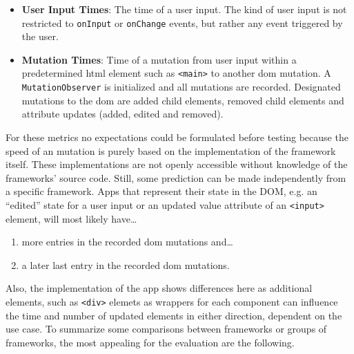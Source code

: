 \documentclass[a4paper, 12pt]{article}
\begin{document}
\begin{itemize}
  \item \textbf{User Input Times}: The time of a user input.
  The kind of user input is not restricted to \verb|onInput| or \verb|onChange| events, but rather any event triggered by the user.
  \item \textbf{Mutation Times}: Time of a mutation from user input within a predetermined \acrshort{html} element such as \verb|<main>| to another \acrshort{dom} mutation.
  A \verb|MutationObserver| is initialized and all mutations are recorded. Designated mutations to the \acrshort{dom} are added child elements, removed child elements and attribute updates (added, edited and removed).
\end{itemize}

For these metrics no expectations could be formulated before testing because the speed of an mutation is purely based on the implementation of the framework itself.
These implementations are not openly accessible without knowledge of the frameworks' source code.
Still, some prediction can be made independently from a specific framework.
Apps that represent their state in the DOM, e.g. an \enquote{edited} state for a user input or an updated value attribute of an \verb|<input>| element, will most likely have\dots

\begin{enumerate}
  \item more entries in the recorded \acrshort{dom} mutations and\dots
  \item a later last entry in the recorded \acrshort{dom} mutations.
\end{enumerate}

Also, the implementation of the app shows differences here as additional elements, such as \verb|<div>| elemets as wrappers for each component can influence the time and number of updated elements in either direction, dependent on the use case.
To summarize some comparisons between frameworks or groups of frameworks, the most appealing for the evaluation are the following.
\end{document}
